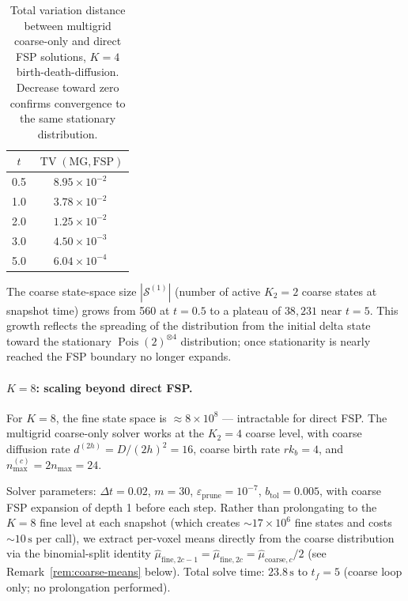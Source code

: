 \documentclass[review,onefignum,onetabnum]{siamart171218}
\newcommand{\calS}{\mathcal{S}}
\newcommand{\Pois}{\operatorname{Pois}}
\newcommand{\TV}{\operatorname{TV}}
\begin{document}
\begin{table}[ht]
\centering
\caption{Total variation distance between multigrid coarse-only
  and direct FSP solutions, $K=4$ birth-death-diffusion.
  Decrease toward zero confirms convergence to the same stationary
  distribution.}
\label{tab:bd-tv}
\begin{tabular}{c|c}
\hline
$t$ & $\TV(\text{MG}, \text{FSP})$ \\
\hline
0.5 & $8.95 \times 10^{-2}$ \\
1.0 & $3.78 \times 10^{-2}$ \\
2.0 & $1.25 \times 10^{-2}$ \\
3.0 & $4.50 \times 10^{-3}$ \\
5.0 & $6.04 \times 10^{-4}$ \\
\hline
\end{tabular}
\end{table}

The coarse state-space size $|\calS^{(1)}|$ (number of active $K_2 = 2$
coarse states at snapshot time) grows from 560 at $t = 0.5$ to
a plateau of $38{,}231$ near $t = 5$.  This growth reflects the
spreading of the distribution from the initial delta state toward
the stationary $\Pois(2)^{\otimes 4}$ distribution; once stationarity
is nearly reached the FSP boundary no longer expands.

\paragraph{$K = 8$: scaling beyond direct FSP.}
For $K = 8$, the fine state space is $\approx 8 \times 10^8$
--- intractable for direct FSP.  The multigrid coarse-only solver
works at the $K_2 = 4$ coarse level, with coarse diffusion rate
$d^{(2h)} = D/(2h)^2 = 16$, coarse birth rate $r k_b = 4$, and
$n_{\max}^{(c)} = 2 n_{\max} = 24$.

Solver parameters: $\Delta t = 0.02$, $m = 30$,
$\varepsilon_{\mathrm{prune}} = 10^{-7}$, $b_{\mathrm{tol}} = 0.005$,
with coarse FSP expansion of depth 1 before each step.
Rather than prolongating to the $K = 8$ fine level at each snapshot
(which creates ${\sim}17\times 10^6$ fine states and costs ${\sim}10\,\mathrm{s}$
per call), we extract per-voxel means directly from the coarse
distribution via the binomial-split identity
$\hat\mu_{\mathrm{fine},2c-1} = \hat\mu_{\mathrm{fine},2c} = \hat\mu_{\mathrm{coarse},c}/2$
(see Remark~\ref{rem:coarse-means} below).
Total solve time: $23.8\,\mathrm{s}$ to $t_f = 5$ (coarse loop only;
no prolongation performed).
\end{document}
